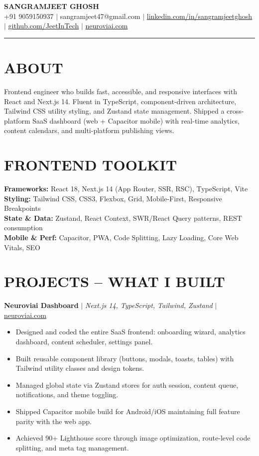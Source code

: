 \documentclass[10pt]{article}
\begin{document}
\begin{center}
{\Large \textbf{SANGRAMJEET GHOSH}} \\[2pt]
{\small +91 9059150937 $|$ sangramjeet47@gmail.com $|$
\href{https://www.linkedin.com/in/sangramjeetghosh}{linkedin.com/in/sangramjeetghosh} $|$
\href{https://github.com/JeetInTech}{github.com/JeetInTech} $|$
\href{https://neuroviai.com}{neuroviai.com}}
\end{center}

\noindent\rule{\textwidth}{0.4pt}

\section*{ABOUT}
Frontend engineer who builds fast, accessible, and responsive interfaces with React and Next.js 14. Fluent in TypeScript, component-driven architecture, Tailwind CSS utility styling, and Zustand state management. Shipped a cross-platform SaaS dashboard (web + Capacitor mobile) with real-time analytics, content calendars, and multi-platform publishing views.

\section*{FRONTEND TOOLKIT}
\textbf{Frameworks:} React 18, Next.js 14 (App Router, SSR, RSC), TypeScript, Vite \\
\textbf{Styling:} Tailwind CSS, CSS3, Flexbox, Grid, Mobile-First, Responsive Breakpoints \\
\textbf{State \& Data:} Zustand, React Context, SWR/React Query patterns, REST consumption \\
\textbf{Mobile \& Perf:} Capacitor, PWA, Code Splitting, Lazy Loading, Core Web Vitals, SEO

\section*{PROJECTS -- WHAT I BUILT}
\textbf{Neuroviai Dashboard} $|$ \textit{Next.js 14, TypeScript, Tailwind, Zustand} $|$ \href{https://neuroviai.com}{neuroviai.com}
\begin{itemize}
\item Designed and coded the entire SaaS frontend: onboarding wizard, analytics dashboard, content scheduler, settings panel.
\item Built reusable component library (buttons, modals, toasts, tables) with Tailwind utility classes and design tokens.
\item Managed global state via Zustand stores for auth session, content queue, notifications, and theme toggling.
\item Shipped Capacitor mobile build for Android/iOS maintaining full feature parity with the web app.
\item Achieved 90+ Lighthouse score through image optimization, route-level code splitting, and meta tag management.
\end{itemize}
\end{document}
